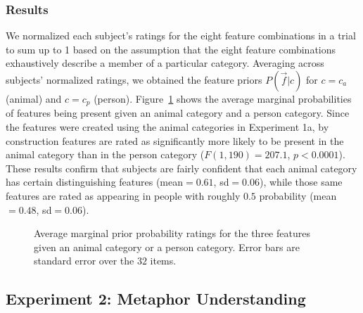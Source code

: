 \documentclass[10pt,letterpaper]{article}
\begin{document}
\subsubsection{Results} 
We normalized each subject's ratings for the eight feature combinations in a trial to sum up to 1 based on the assumption that the eight feature combinations exhaustively describe a member of a particular category. Averaging across subjects' normalized ratings, we obtained the feature priors $P(\vec f | c)$ for $c = c_a$ (animal) and $c = c_p$ (person).
Figure~\ref{prior} shows the average marginal probabilities of features being present given an animal category and a person category. Since the features were created using the animal categories in Experiment 1a, by construction features are rated as significantly more likely to be present in the animal category than in the person category ($F(1, 190) = 207.1$, $p < 0.0001$). These results confirm that subjects are fairly confident that each animal category has certain distinguishing features (mean$= 0.61$, sd$=0.06$), while those same features are rated as appearing in people with roughly $0.5$ probability (mean$=0.48$, sd$=0.06$).
\begin{figure}[t]
\begin{center}
\end{center}
\caption{Average marginal prior probability ratings for the three features given an animal category or a person category. Error bars are standard error over the $32$ items.} 
\label{prior}
\end{figure}

\subsection{Experiment 2: Metaphor Understanding}
\end{document}
